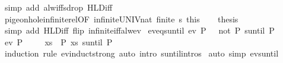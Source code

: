 \begin{isabellebody}
\ {\isacharparenleft}simp\ add{\isacharcolon}\ alw{\isacharunderscore}iff{\isacharunderscore}sdrop\ HLD{\isacharunderscore}iff{\isacharparenright}\isanewline
\ \ \isamarkupfalse%
\ pigeonhole{\isacharunderscore}infinite{\isacharunderscore}rel{\isacharbrackleft}OF\ infinite{\isacharunderscore}UNIV{\isacharunderscore}nat\ {\isacartoucheopen}finite\ s{\isacartoucheclose}\ this{\isacharbrackright}\isanewline
\ \ \isamarkupfalse%
\ {\isacharquery}thesis\isanewline
\ \ \ \ \isamarkupfalse%
\ {\isacharparenleft}simp\ add{\isacharcolon}\ HLD{\isacharunderscore}iff\ flip{\isacharcolon}\ infinite{\isacharunderscore}iff{\isacharunderscore}alw{\isacharunderscore}ev{\isacharparenright}\isanewline
{}\isamarkupfalse%
%
\endisatagproof
{\isafoldproof}%
%
\isadelimproof
\isanewline
%
\endisadelimproof
\isanewline
{}\isamarkupfalse%
\ ev{\isacharunderscore}eq{\isacharunderscore}suntil{\isacharcolon}\ {\isachardoublequoteopen}ev\ P\ {\isasymomega}\ {\isasymlongleftrightarrow}\ {\isacharparenleft}not\ P\ suntil\ P{\isacharparenright}\ {\isasymomega}{\isachardoublequoteclose}\isanewline
%
\isadelimproof
%
\endisadelimproof
%
\isatagproof
{}\isamarkupfalse%
\isanewline
\ \ \isamarkupfalse%
\ {\isachardoublequoteopen}ev\ P\ {\isasymomega}{\isachardoublequoteclose}\ \isamarkupfalse%
\ \isamarkupfalse%
\ {\isachardoublequoteopen}{\isacharparenleft}{\isacharparenleft}{\isasymlambda}xs{\isachardot}\ {\isasymnot}\ P\ xs{\isacharparenright}\ suntil\ P{\isacharparenright}\ {\isasymomega}{\isachardoublequoteclose}\isanewline
\ \ \ \ \isamarkupfalse%
\ {\isacharparenleft}induction\ rule{\isacharcolon}\ ev{\isacharunderscore}induct{\isacharunderscore}strong{\isacharparenright}\ {\isacharparenleft}auto\ intro{\isacharcolon}\ suntil{\isachardot}intros{\isacharparenright}\isanewline
{}\isamarkupfalse%
\ {\isacharparenleft}auto\ simp{\isacharcolon}\ ev{\isacharunderscore}suntil{\isacharparenright}%
\endisatagproof
{\isafoldproof}%
%
\isadelimproof
\isanewline
%
\endisadelimproof
%
\isadelimtheory
\isanewline
%
\endisadelimtheory
%
\isatagtheory
{}\isamarkupfalse%
%
\endisatagtheory
{\isafoldtheory}%
%
\isadelimtheory
%
\endisadelimtheory
%
\end{isabellebody}%
\endinput
